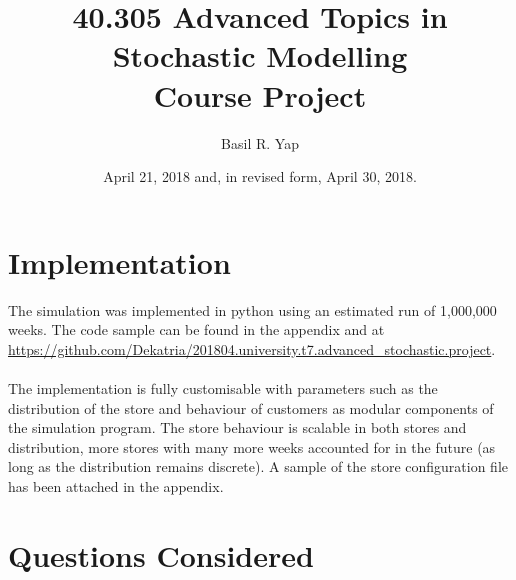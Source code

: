 \documentclass{amsart}
\theoremstyle{definition}
\theoremstyle{remark}
\numberwithin{equation}{section}
\begin{document}
\title{40.305 Advanced Topics in Stochastic Modelling\\Course Project}

\author{Basil R. Yap}





\date{April 21, 2018 and, in revised form, April 30, 2018.}

\maketitle

\section*{Implementation}
The simulation was implemented in python using an estimated run of 1,000,000 weeks. The code sample can be found in the appendix and at 
\url{https://github.com/Dekatria/201804.university.t7.advanced_stochastic.project}.\\
\vspace{1pt}\\
The implementation is fully customisable with parameters such as the distribution of the store and behaviour of customers as modular components of the simulation program. The store behaviour is scalable in both stores and distribution, more stores with many more weeks accounted for in the future (as long as the distribution remains discrete). A sample of the store configuration file has been attached in the appendix.

\section*{Questions Considered}

\end{document}
